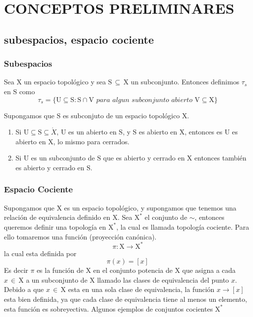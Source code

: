 \chapter{CONCEPTOS PRELIMINARES}

\section{subespacios, espacio cociente}

\subsection{Subespacios}
Sea $\mathrm{X}$ un espacio topológico y sea $ \mathrm{S} \, \subseteq \, \mathrm{X}$ un subconjunto. Entonces definimos $\tau_{s}$ en $\mathrm{S}$ como 
\begin{equation*}
\tau_{s} = \{ \mathrm{U} \subseteq \mathrm{S}: \mathrm{S} \cap \mathrm{V} \,\,  para \,\, algun \,\,  subconjunto \,\, abierto \,\, \mathrm{V} \subseteq \mathrm{X} \}
\end{equation*}

\begin{prp} Supongamos que $\mathrm{S}$ es subconjuto de un espacio topológico $\mathrm{X}$.
	\begin{enumerate}
		\item Si $\mathrm{U} \subseteq \mathrm{S} \subseteq \mathring{X}$, $\mathrm{U}$ es un abierto en $\mathrm{S}$, y $\mathrm{S}$ es abierto en $\mathrm{X}$, entonces es $\mathrm{U}$ es abierto en $\mathrm{X}$, lo mismo para cerrados.
		\item Si $\mathrm{U}$ es un subconjunto de $\mathrm{S}$ que es abierto y cerrado en $\mathrm{X}$ entonces también es abierto y cerrado en $\mathrm{S}$.
	\end{enumerate}

\end{prp}

\subsection{Espacio Cociente}
Supongamos que $\mathrm{X}$ es un espacio topológico, y supongamos que tenemos una relación de equivalencia definido en $\mathrm{X}$. Sea $\mathrm{X}^{*}$ el conjunto de $\sim$, entonces queremos definir una topología en $\mathrm{X}^{*}$, la cual es llamada topología cociente. 
Para ello tomaremos una función (proyección canónica). 
\begin{equation*}
\pi : \mathrm{X} \rightarrow \mathrm{X^{*}} 
\end{equation*}
la cual esta definida por
\begin{equation*}
\pi (x) =[x]
\end{equation*}
Es decir $\pi$ es la función de $\mathrm{X}$ en el conjunto potencia de $\mathrm{X}$ que asigna a cada $x \,  \in \, \mathrm{X}$ a un subconjunto de $\mathrm{X}$
llamado las clases de equivalencia del punto $x$.
Debido a que  $x \,  \in \, \mathrm{X}$ esta en una sola clase de equivalencia, la función $x \rightarrow [x] $ esta bien definida, ya que cada clase de equivalencia tiene al menos un elemento, esta función es sobreyectiva.  
Algunos ejemplos de conjuntos cocientes $\mathrm{X}^{*}$

